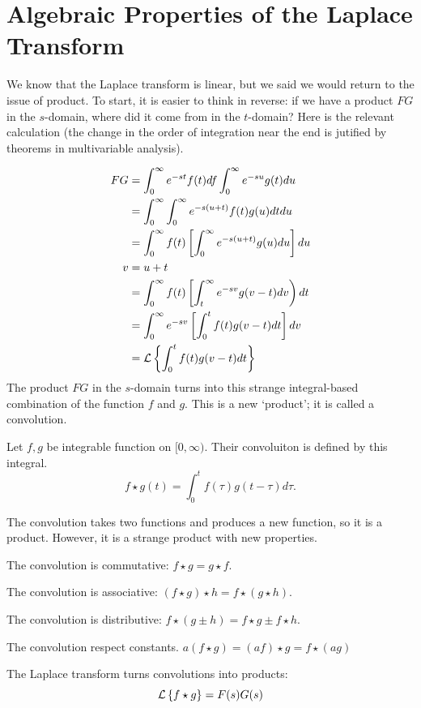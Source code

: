 \documentclass[fleqn,letterpaper]{report}
\begin{document}
\section{Algebraic Properties of the Laplace Transform}
\label{laplace-algebraic}

We know that the Laplace transform is linear, but we said we
would return to the issue of product. To start, it is easier
to think in reverse: if we have a product $FG$ in the
$s$-domain, where did it come from in the $t$-domain?
Here is the relevant calculation (the change in the order of
integration near the end is jutified by theorems in
multivariable analysis).

\begin{align*}
FG & = \int_0^\infty e^{-st} f(t) df \int_0^\infty e^{-su} g(t)
du \\
& = \int_0^\infty \int_0^\infty e^{-s(u+t)} f(t)g(u) dt du \\
& = \int_0^\infty f(t) \left[ \int_0^\infty e^{-s(u+t)} g(u) du
\right] du \\
v & = u+ t \\
& = \int_0^\infty f(t) \left[ \int_t^\infty e^{-sv} g(v-t) dv
\right) dt \\
& = \int_0^\infty e^{-sv} \left[\int_0^t f(t) g(v-t) dt \right]
dv \\
& = \mathcal{L} \left\{ \int_0^t f(t) g(v-t) dt \right\} 
\end{align*} 
The product $FG$ in the $s$-domain turns into this strange
integral-based combination of the function $f$ and $g$. This
is a new `product'; it is called a convolution.

\begin{defn}
Let $f,g$ be integrable function on $[0,\infty)$. Their
convoluiton is defined by this integral.
\begin{equation*}
f \star g (t) = \int_0^t f(\tau) g(t-\tau) d \tau.
\end{equation*}
\end{defn}

The convolution takes two functions and produces a new
function, so it is a product. However, it is a strange product
with new properties. 

\begin{prop}
\begin{smallitemize}
\item The convolution is commutative: $f \star g = g \star f$. 
\item The convolution is associative: $(f \star g) \star h = f
\star (g \star h)$. 
\item The convolution is distributive: $f \star (g \pm h) = f
\star g \pm f \star h$. 
\item The convolution respect constants. $a (f \star g) = (af)
\star g = f \star (ag)$
\item The Laplace transform turns convolutions into products:
\begin{equation*}
\mathcal{L} \left\{ f \star g \right\} = F(s) G(s)
\end{equation*}
\end{smallitemize}
\end{prop}
\end{document}
